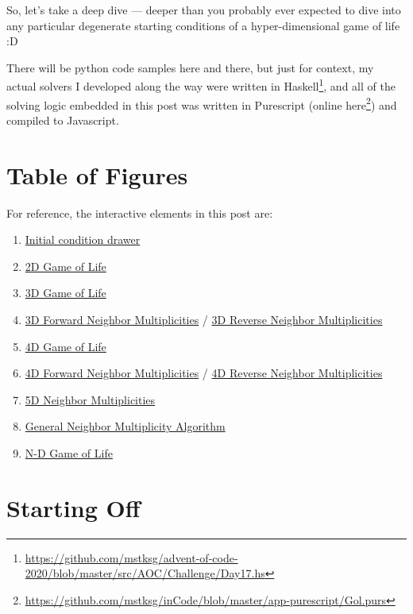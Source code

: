 \documentclass[]{article}
\renewcommand{\href}[2]{#2\footnote{\url{#1}}}
\begin{document}
So, let's take a deep dive --- deeper than you probably ever expected to dive
into any particular degenerate starting conditions of a hyper-dimensional game
of life :D

There will be python code samples here and there, but just for context, my
actual solvers I developed along the way were
\href{https://github.com/mstksg/advent-of-code-2020/blob/master/src/AOC/Challenge/Day17.hs}{written
in Haskell}, and all of the solving logic embedded in this post was written in
Purescript
(\href{https://github.com/mstksg/inCode/blob/master/app-purescript/Gol.purs}{online
here}) and compiled to Javascript.

\hypertarget{table-of-figures}{%
\section{Table of Figures}\label{table-of-figures}}

For reference, the interactive elements in this post are:

\begin{enumerate}
\def\labelenumi{\arabic{enumi}.}
\tightlist
\item
  \protect\hyperlink{golDrawer}{Initial condition drawer}
\item
  \protect\hyperlink{gol2D}{2D Game of Life}
\item
  \protect\hyperlink{gol3D}{3D Game of Life}
\item
  \protect\hyperlink{golSyms3DForward}{3D Forward Neighbor Multiplicities} /
  \protect\hyperlink{golSyms3DReverse}{3D Reverse Neighbor Multiplicities}
\item
  \protect\hyperlink{gol4D}{4D Game of Life}
\item
  \protect\hyperlink{golSyms4DForward}{4D Forward Neighbor Multiplicities} /
  \protect\hyperlink{golSyms4DReverse}{4D Reverse Neighbor Multiplicities}
\item
  \protect\hyperlink{golSyms5D}{5D Neighbor Multiplicities}
\item
  \protect\hyperlink{golTree}{General Neighbor Multiplicity Algorithm}
\item
  \protect\hyperlink{golFlat}{N-D Game of Life}
\end{enumerate}

\hypertarget{starting-off}{%
\section{Starting Off}\label{starting-off}}
\end{document}
